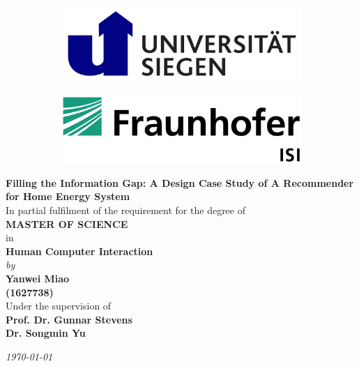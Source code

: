 \begin{titlepage}

\begin{center}

\vspace*{-1cm}

\begin{figure}[h]
  \begin{subfigure}{0.50\textwidth}
    \includegraphics[width=0.8\linewidth, left]{Images/siegen.png}
  \end{subfigure}
  \begin{subfigure}{0.49\textwidth}
    \includegraphics[width=0.8\linewidth, right]{Images/isi.jpeg}
  \end{subfigure}
\end{figure}

\vfill

{\Large \bf Filling the Information Gap: A Design Case Study of A Recommender for Home Energy System} \\

\vfill
In partial fulfilment of the requirement for the degree of\\
{\large \bf MASTER OF SCIENCE}\\
in\\ 
{\large \bf Human Computer Interaction } \\
{\em by} \\
{\large \bf Yanwei Miao} \\
{\large \bf (1627738)}\\

Under the supervision of \\
{\bf \large Prof. Dr. Gunnar Stevens} \\
{\bf \large Dr. Songmin Yu} \\

\vfill

{\it \large \today}

\end{center}

\end{titlepage}

\clearpage